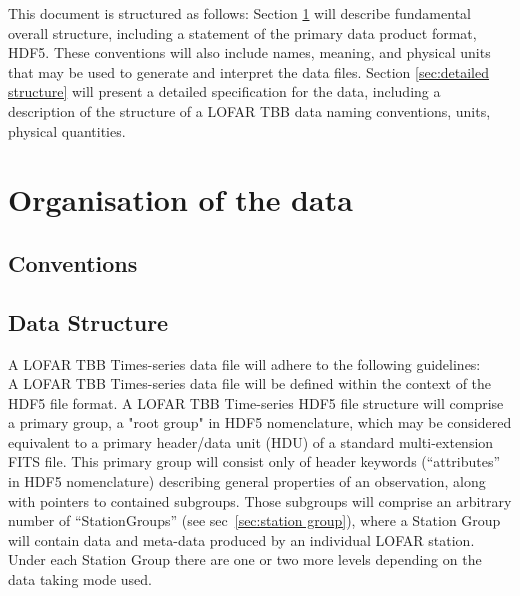 \documentclass[a4paper,10pt,bibtotoc]{scrartcl}
\begin{document}
This document is structured as follows: %
Section \ref{sec:structure} will describe fundamental overall
structure, including a statement of the primary data product format,
HDF5. These conventions will also include names, meaning, and physical
units that may be used to generate and interpret the data files. %
Section \ref{sec:detailed structure} will present a detailed
specification for the data, including a description of the structure
of a LOFAR TBB data naming conventions, units, physical quantities. %

\clearpage

\section{Organisation of the data}
\label{sec:structure}

\subsection{Conventions}






\subsection{Data Structure}

A LOFAR TBB Times-series data file will adhere to the following guidelines:\\

A LOFAR TBB Times-series data file will be defined within the context
of the HDF5 file format.  A LOFAR TBB Time-series HDF5 file structure
will comprise a primary group, a "root group" in HDF5 nomenclature,
which may be considered equivalent to a primary header/data unit (HDU)
of a standard multi-extension FITS file.  This primary group will
consist only of header keywords (“attributes” in HDF5 nomenclature)
describing general properties of an observation, along with pointers
to contained subgroups.  Those subgroups will comprise an arbitrary
number of ``StationGroups'' (see sec~\ref{sec:station group}), where a
Station Group will contain data and meta-data produced by an
individual LOFAR station. Under each Station Group there are one or two more levels
depending on the data taking mode used.
\end{document}
